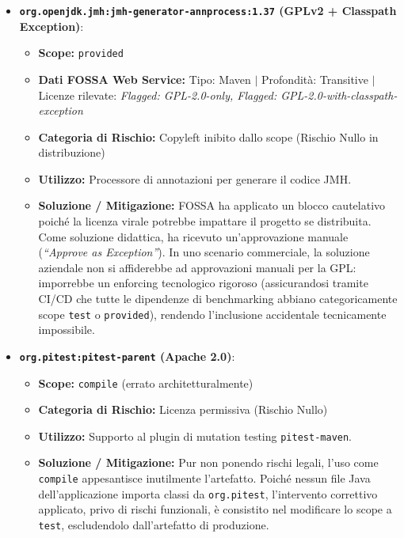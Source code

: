 \begin{itemize}
\begin{itemize}
        \item \textbf{\texttt{org.openjdk.jmh:jmh-generator-annprocess:1.37} (GPLv2 + Classpath Exception)}:
        \begin{itemize}
            \item \textbf{Scope:} \texttt{provided}
            \item \textbf{Dati FOSSA Web Service:} Tipo: Maven $\vert$ Profondità: Transitive $\vert$ Licenze rilevate: \textit{Flagged: GPL-2.0-only, Flagged: GPL-2.0-with-classpath-exception}
            \item \textbf{Categoria di Rischio:} Copyleft inibito dallo scope (Rischio Nullo in distribuzione)
            \item \textbf{Utilizzo:} Processore di annotazioni per generare il codice JMH.
            \item \textbf{Soluzione / Mitigazione:} FOSSA ha applicato un blocco cautelativo poiché la licenza virale potrebbe impattare il progetto se distribuita. Come soluzione didattica, ha ricevuto un'approvazione manuale (\textit{``Approve as Exception''}). In uno scenario commerciale, la soluzione aziendale non si affiderebbe ad approvazioni manuali per la GPL: imporrebbe un enforcing tecnologico rigoroso (assicurandosi tramite CI/CD che tutte le dipendenze di benchmarking abbiano categoricamente scope \texttt{test} o \texttt{provided}), rendendo l'inclusione accidentale tecnicamente impossibile.
        \end{itemize}
        
        \item \textbf{\texttt{org.pitest:pitest-parent} (Apache 2.0)}:
        \begin{itemize}
            \item \textbf{Scope:} \texttt{compile} (errato architetturalmente)
            \item \textbf{Categoria di Rischio:} Licenza permissiva (Rischio Nullo)
            \item \textbf{Utilizzo:} Supporto al plugin di mutation testing \texttt{pitest-maven}.
            \item \textbf{Soluzione / Mitigazione:} Pur non ponendo rischi legali, l'uso come \texttt{compile} appesantisce inutilmente l'artefatto. Poiché nessun file Java dell'applicazione importa classi da \texttt{org.pitest}, l'intervento correttivo applicato, privo di rischi funzionali, è consistito nel modificare lo scope a \texttt{test}, escludendolo dall'artefatto di produzione.
        \end{itemize}
    \end{itemize}
\end{itemize}

